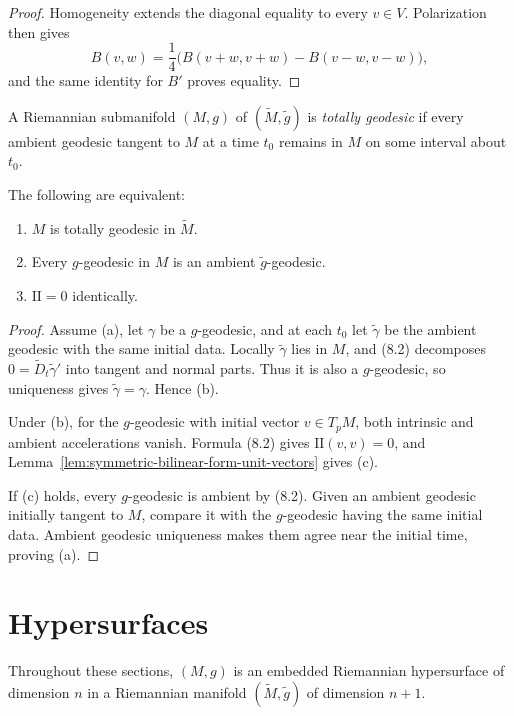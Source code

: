 \begin{proof}
\sketch Homogeneity extends the diagonal equality to every $v\in V$.
Polarization then gives
\[
B(v,w)=\frac14\bigl(B(v+w,v+w)-B(v-w,v-w)\bigr),
\]
and the same identity for $B'$ proves equality.
\end{proof}

A Riemannian submanifold $(M,g)$ of $(\widetilde M,\widetilde g)$ is
\emph{totally geodesic} if every ambient geodesic tangent to $M$ at a time
$t_0$ remains in $M$ on some interval about $t_0$.

\begin{proposition}
\label{prop:totally-geodesic-equivalence}

The following are equivalent:
\begin{enumerate}
\item[(a)] $M$ is totally geodesic in $\widetilde M$.
\item[(b)] Every $g$-geodesic in $M$ is an ambient
$\widetilde g$-geodesic.
\item[(c)] $\mathrm{II}=0$ identically.
\end{enumerate}
\end{proposition}

\begin{proof}
\sketch Assume (a), let $\gamma$ be a $g$-geodesic, and at each $t_0$ let
$\widetilde\gamma$ be the ambient geodesic with the same initial data.
Locally $\widetilde\gamma$ lies in $M$, and (8.2) decomposes
$0=\widetilde D_t\widetilde\gamma'$ into tangent and normal parts. Thus it is
also a $g$-geodesic, so uniqueness gives
$\widetilde\gamma=\gamma$. Hence (b).

Under (b), for the $g$-geodesic with initial vector $v\in T_pM$, both
intrinsic and ambient accelerations vanish. Formula (8.2) gives
$\mathrm{II}(v,v)=0$, and
Lemma~\ref{lem:symmetric-bilinear-form-unit-vectors} gives (c).

If (c) holds, every $g$-geodesic is ambient by (8.2). Given an ambient
geodesic initially tangent to $M$, compare it with the $g$-geodesic having
the same initial data. Ambient geodesic uniqueness makes them agree near the
initial time, proving (a).
\end{proof}
\section{Hypersurfaces}

Throughout these sections, $(M,g)$ is an embedded Riemannian hypersurface of
dimension $n$ in a Riemannian manifold $(\widetilde M,\widetilde g)$ of
dimension $n+1$.

